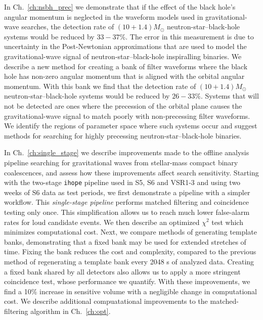 In Ch.~\ref{ch:nsbh_prec} we demonstrate that if the effect of the black
hole's angular momentum is neglected in the waveform models used in
gravitational-wave searches, the detection rate of $(10+1.4)M_{\odot}$
neutron-star--black-hole
systems would be reduced by $33 - 37\%$. The error in this measurement is due
to uncertainty in the Post-Newtonian approximations that are used to model the
gravitational-wave signal of neutron-star--black-hole inspiralling binaries. We
describe a new method for creating a bank of filter waveforms where the black
hole has non-zero angular momentum that is aligned with the orbital angular
momentum. With this bank we find that the detection rate of $(10+1.4)M_{\odot}$
neutron-star--black-hole systems would be reduced by $26-33\%$. Systems that
will not be detected are ones where the precession of the orbital plane causes
the gravitational-wave signal to match poorly with non-precessing filter
waveforms. We identify the regions of parameter space where such systems occur
and suggest methods for searching for highly precessing
neutron-star--black-hole binaries.

In Ch.~\ref{ch:single_stage} we describe improvements
made to the offline analysis pipeline searching for gravitational waves from
stellar-mass compact binary coalescences, and assess how these improvements
affect search sensitivity. Starting with the two-stage \texttt{ihope} pipeline
used in S5, S6 and VSR1-3 and using two weeks of S6 data as test periods,
we first demonstrate a pipeline with a simpler workflow. This
\emph{single-stage pipeline} performs matched filtering and coincidence
testing only once. This simplification allows us to reach much lower
false-alarm rates for loud candidate events. We then describe an optimized
$\chi^2$ test which minimizes computational cost. Next, we compare methods of
generating template banks, demonstrating that a fixed bank may be used for
extended stretches of time. Fixing the bank reduces the cost and complexity,
compared to the previous method of regenerating a template bank every 2048 s
of analyzed data. Creating a fixed bank shared by all detectors also allows us
to apply a more stringent coincidence test, whose performance we quantify.
With these improvements, we find a 10\% increase in sensitive volume
with a negligible change in computational cost. We describe additional
compuatational improvements to the matched-filtering algorithm in Ch.~\ref{ch:opt}.


